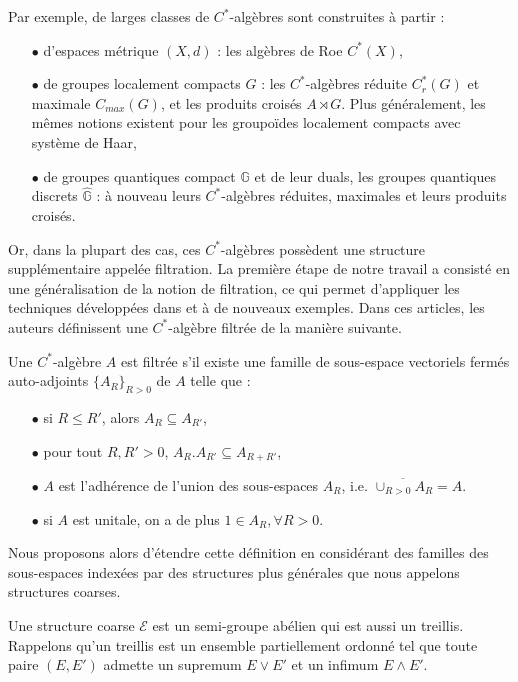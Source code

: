 Par exemple, de larges classes de $C^*$-algèbres sont construites à partir :\\ 
\begin{itemize}
\item[$\bullet$] d'espaces métrique $(X,d)$ : les algèbres de Roe $C^*(X)$,
\item[$\bullet$] de groupes localement compacts $G$ : les $C^*$-algèbres réduite $C^*_r(G)$ et maximale $C_{max}(G)$, et les produits croisés $A\rtimes G$. Plus généralement, les mêmes notions existent pour les groupoïdes localement compacts avec système de Haar,
\item[$\bullet$] de groupes quantiques compact $\mathbb G$ et de leur duals, les groupes quantiques discrets $\hat{\mathbb G}$ : à nouveau leurs $C^*$-algèbres réduites, maximales et leurs produits croisés.\\
\end{itemize}

Or, dans la plupart des cas, ces $C^*$-algèbres possèdent une structure supplémentaire appelée filtration. La première étape de notre travail a consisté en une généralisation de la notion de filtration, ce qui permet d'appliquer les techniques développées dans \cite{OY2} et \cite{OY3} à de nouveaux exemples. Dans ces articles, les auteurs définissent une $C^*$-algèbre filtrée de la manière suivante.

\begin{definition}
Une $C^*$-algèbre $A$ est filtrée s'il existe une famille de sous-espace vectoriels fermés auto-adjoints $\{A_R\}_{R>0}$ de $A$ telle que :
\begin{itemize}
\item[$\bullet$] si $R\leq R'$, alors $A_R\subseteq A_{R'}$,
\item[$\bullet$] pour tout $R,R'>0$, $A_R.A_{R'}\subseteq A_{R+R'}$,
\item[$\bullet$] $A$ est l'adhérence de l'union des sous-espaces $A_R$, i.e. $\overline{\cup_{R>0}A_R} = A$.
\item[$\bullet$] si $A$ est unitale, on a de plus $1\in A_R,\forall R>0$.
\end{itemize}
\end{definition}

Nous proposons alors d'étendre cette définition en considérant des familles des sous-espaces indexées par des structures plus générales que nous appelons structures coarses. 

\begin{definition}
Une structure coarse $\mathcal E$ est un semi-groupe abélien qui est aussi un treillis. %
Rappelons qu'un treillis est un ensemble partiellement ordonné tel que toute paire $(E,E')$ admette un supremum $E\vee E'$ et un infimum $E\wedge E'$.
\end{definition}

